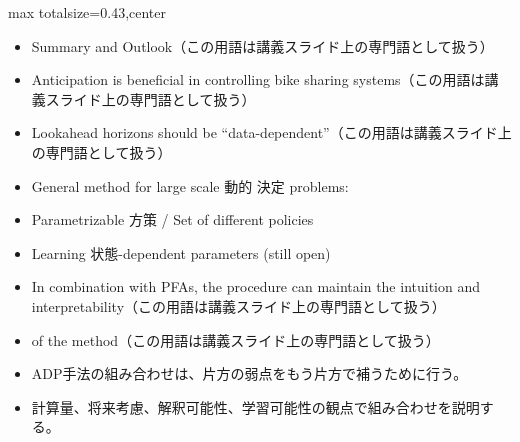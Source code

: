 \clearpage
{}
\begin{minipage}[t]{0.405\textwidth}
\begin{adjustbox}{max totalsize={\textwidth}{0.43\textheight},center}
\begin{minipage}{\textwidth}\scriptsize
{}\begin{itemize}
\item Summary and Outlook（この用語は講義スライド上の専門語として扱う）
\item Anticipation is beneficial in controlling bike sharing systems（この用語は講義スライド上の専門語として扱う）
\item Lookahead horizons should be “data-dependent”（この用語は講義スライド上の専門語として扱う）
\item General method for large scale 動的 決定 problems:
\item Parametrizable 方策 / Set of different policies
\item Learning 状態-dependent parameters (still open)
\item In combination with PFAs, the procedure can maintain the intuition and interpretability（この用語は講義スライド上の専門語として扱う）
\item of the method（この用語は講義スライド上の専門語として扱う）
\end{itemize}\begin{itemize}
\item ADP手法の組み合わせは、片方の弱点をもう片方で補うために行う。
\item 計算量、将来考慮、解釈可能性、学習可能性の観点で組み合わせを説明する。
\end{itemize}
\end{minipage}
\end{adjustbox}
\end{minipage}\hfill
